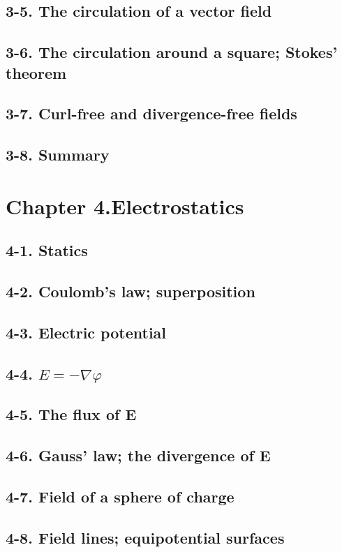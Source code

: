 \documentclass{article}
\begin{document}
\subsection{3-5. The circulation of a vector field}
\subsection{3-6. The circulation around a square; Stokes’ theorem}
\subsection{3-7. Curl-free and divergence-free fields}
\subsection{3-8. Summary}
\section{Chapter 4.Electrostatics}
\subsection{4-1. Statics}
\subsection{4-2. Coulomb’s law; superposition}
\subsection{4-3. Electric potential}
\subsection{4-4. $E=- \nabla \varphi$}
\subsection{4-5. The flux of E}
\subsection{4-6. Gauss’ law; the divergence of E}
\subsection{4-7. Field of a sphere of charge}
\subsection{4-8. Field lines; equipotential surfaces}
\end{document}
